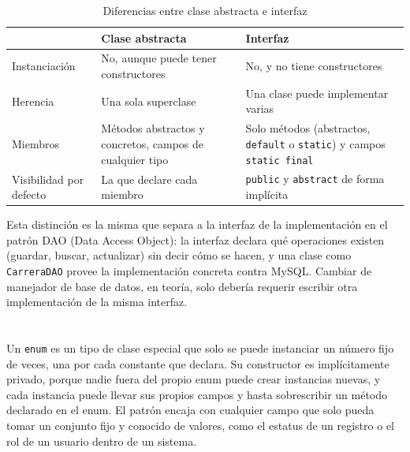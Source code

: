 \documentclass[10pt,a4paper]{article}
\begin{document}
\begin{table}[H]
	\centering
	\begin{tabular}{p{4cm} | p{5cm} | p{5cm}}\hline \hline
		& \textbf{Clase abstracta} & \textbf{Interfaz} \\ \hline \hline
		Instanciación & No, aunque puede tener constructores & No, y no tiene constructores \\ \hline
		Herencia & Una sola superclase & Una clase puede implementar varias \\ \hline
		Miembros & Métodos abstractos y concretos, campos de cualquier tipo & Solo métodos (abstractos, \texttt{default} o \texttt{static}) y campos \texttt{static final} \\ \hline
		Visibilidad por defecto & La que declare cada miembro & \texttt{public} y \texttt{abstract} de forma implícita \\ \hline \hline
	\end{tabular}
	\caption{Diferencias entre clase abstracta e interfaz}
	\label{tabla:abstracta-interfaz}
\end{table}

Esta distinción es la misma que separa a la interfaz de la implementación en el patrón DAO (Data Access Object): la interfaz declara qué operaciones existen (guardar, buscar, actualizar) sin decir cómo se hacen, y una clase como \texttt{CarreraDAO} provee la implementación concreta contra MySQL. Cambiar de manejador de base de datos, en teoría, solo debería requerir escribir otra implementación de la misma interfaz.

\section{\color{colorIPN}{Enums}}

Un \texttt{enum} es un tipo de clase especial que solo se puede instanciar un número fijo de veces, una por cada constante que declara. Su constructor es implícitamente privado, porque nadie fuera del propio enum puede crear instancias nuevas, y cada instancia puede llevar sus propios campos y hasta sobrescribir un método declarado en el enum. El patrón encaja con cualquier campo que solo pueda tomar un conjunto fijo y conocido de valores, como el estatus de un registro o el rol de un usuario dentro de un sistema.

\section{\color{colorIPN}{Excepciones: checked y unchecked}}
\end{document}
